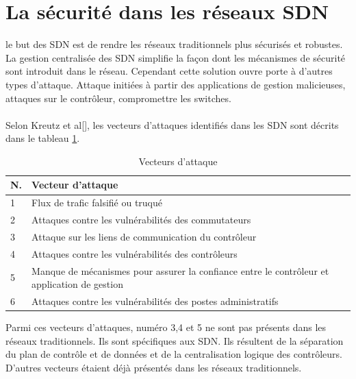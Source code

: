 \section{La sécurité dans les réseaux SDN}
le but des SDN est de rendre les réseaux traditionnels plus sécurisés et robustes. La gestion centralisée des SDN simplifie la façon dont les mécanismes de sécurité sont introduit dans le réseau. Cependant cette solution ouvre porte à d'autres types d'attaque. Attaque initiées à partir des applications de gestion malicieuses, attaques sur le contrôleur, compromettre les switches.\\\\
Selon Kreutz et al[\cite{7}], les vecteurs d'attaques identifiés dans les SDN sont décrits dans le tableau \ref{table:Threat_Vectors}.
\newpage
\begin{table}[h]
\begin{center}
\begin{tabular}{  m{0.5cm} m{11cm} }
\hline
\textbf{N}. & \textbf{Vecteur d'attaque}\\
\hline
1 & Flux de trafic falsifié ou truqué\\
2 & Attaques contre les vulnérabilités des commutateurs\\
3 & Attaque sur les liens de communication du contrôleur\\
4 & Attaques contre les vulnérabilités des contrôleurs\\
5 & Manque de mécanismes pour assurer la confiance entre le contrôleur
et application de gestion\\
6 & Attaques contre les vulnérabilités des postes administratifs\\
\hline
\end{tabular}
\caption{Vecteurs d'attaque}
\label{table:Threat_Vectors}
\end{center}
\end{table}

Parmi ces vecteurs d'attaques, numéro 3,4 et 5 ne sont pas présents dans les réseaux traditionnels. Ils sont spécifiques aux SDN. Ils résultent de la séparation du plan de contrôle et de données et de la centralisation logique des contrôleurs. D'autres vecteurs étaient déjà présentés dans les réseaux traditionnels.

